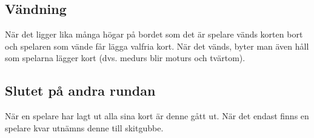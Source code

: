 \documentclass[a4paper,12pt]{article}
\begin{document}
\subsection{Vändning}
När det ligger lika många högar på bordet som det är spelare vänds korten bort och spelaren som vände får lägga valfria kort. När det vänds, byter man även håll som spelarna lägger kort (dvs. medurs blir moturs och tvärtom).

\subsection{Slutet på andra rundan}
När en spelare har lagt ut alla sina kort är denne gått ut. När det endast finns en spelare kvar utnämns denne till skitgubbe.
\end{document}
